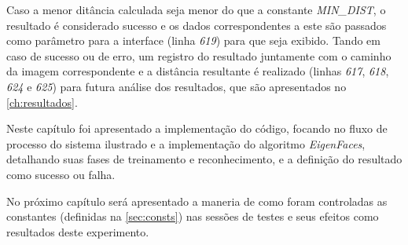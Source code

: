 Caso a menor ditância calculada seja menor do que a constante \textit{MIN\_DIST}, o resultado é considerado sucesso e os dados correspondentes a este são passados como parâmetro para a interface (linha \textit{619}) para que seja exibido. Tando em caso de sucesso ou de erro, um registro do resultado juntamente com o caminho da imagem correspondente e a distância resultante é realizado (linhas \textit{617}, \textit{618}, \textit{624} e \textit{625}) para futura análise dos resultados, que são apresentados no  \autoref{ch:resultados}.




Neste capítulo foi apresentado a implementação do código, focando no fluxo de processo do sistema ilustrado e a implementação do algoritmo \textit{EigenFaces}, detalhando suas fases de treinamento e reconhecimento, e a definição do resultado como sucesso ou falha.

No próximo capítulo será apresentado a maneria de como foram controladas as constantes (definidas na \autoref{sec:consts}) nas sessões de testes e seus efeitos como resultados deste experimento.



%
